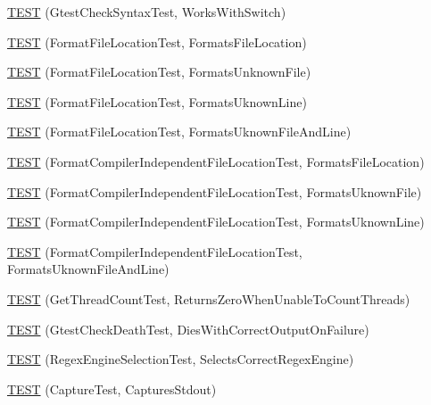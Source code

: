 \begin{DoxyCompactItemize}
\mbox{\hyperlink{namespacetesting_1_1internal_a4dfd147ff396984fca799878cb53dcea}{T\+E\+ST}} (Gtest\+Check\+Syntax\+Test, Works\+With\+Switch)
\item 
\mbox{\hyperlink{namespacetesting_1_1internal_a1a1c20d78e9e75b9c7f2b767eb62611b}{T\+E\+ST}} (Format\+File\+Location\+Test, Formats\+File\+Location)
\item 
\mbox{\hyperlink{namespacetesting_1_1internal_ace2f5407afdfb0767035d44b6758e4a0}{T\+E\+ST}} (Format\+File\+Location\+Test, Formats\+Unknown\+File)
\item 
\mbox{\hyperlink{namespacetesting_1_1internal_a17d1f472b6c1154de7b5b008b964ee32}{T\+E\+ST}} (Format\+File\+Location\+Test, Formats\+Uknown\+Line)
\item 
\mbox{\hyperlink{namespacetesting_1_1internal_a1195aaf7258c5442de7aebd95acefb9f}{T\+E\+ST}} (Format\+File\+Location\+Test, Formats\+Uknown\+File\+And\+Line)
\item 
\mbox{\hyperlink{namespacetesting_1_1internal_a9c12f8c1ebb19906e8fa0c430d139076}{T\+E\+ST}} (Format\+Compiler\+Independent\+File\+Location\+Test, Formats\+File\+Location)
\item 
\mbox{\hyperlink{namespacetesting_1_1internal_a65ad1cad17717c1b8ac4c2d4bef5e079}{T\+E\+ST}} (Format\+Compiler\+Independent\+File\+Location\+Test, Formats\+Uknown\+File)
\item 
\mbox{\hyperlink{namespacetesting_1_1internal_a0315a64a661f249628f2884080e0614f}{T\+E\+ST}} (Format\+Compiler\+Independent\+File\+Location\+Test, Formats\+Uknown\+Line)
\item 
\mbox{\hyperlink{namespacetesting_1_1internal_a8b9aee556f3dec6e67c35830ba55e0bd}{T\+E\+ST}} (Format\+Compiler\+Independent\+File\+Location\+Test, Formats\+Uknown\+File\+And\+Line)
\item 
\mbox{\hyperlink{namespacetesting_1_1internal_a5ad8299ae9325382f01b945f4f81711e}{T\+E\+ST}} (Get\+Thread\+Count\+Test, Returns\+Zero\+When\+Unable\+To\+Count\+Threads)
\item 
\mbox{\hyperlink{namespacetesting_1_1internal_afabff70df09a0e4fcda96dd36460c2b9}{T\+E\+ST}} (Gtest\+Check\+Death\+Test, Dies\+With\+Correct\+Output\+On\+Failure)
\item 
\mbox{\hyperlink{namespacetesting_1_1internal_a198f7132f76dd44d48dac54dc5d38fbb}{T\+E\+ST}} (Regex\+Engine\+Selection\+Test, Selects\+Correct\+Regex\+Engine)
\item 
\mbox{\hyperlink{namespacetesting_1_1internal_a0b658d88cea3a2fe6775b1b269c0204b}{T\+E\+ST}} (Capture\+Test, Captures\+Stdout)

\end{DoxyCompactItemize}
